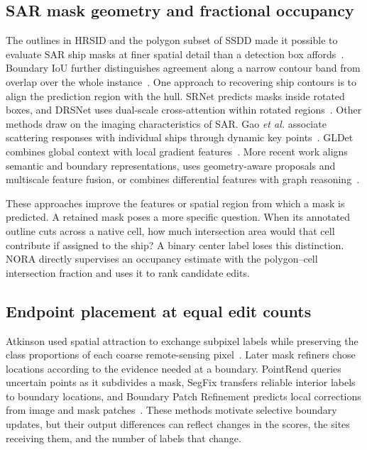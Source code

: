 \documentclass[journal]{IEEEtran}
\begin{document}
\subsection{SAR mask geometry and fractional occupancy}
The outlines in HRSID and the polygon subset of SSDD made it possible to evaluate SAR ship masks at finer spatial detail than a detection box affords~\cite{hrsid,ssdd}. Boundary IoU further distinguishes agreement along a narrow contour band from overlap over the whole instance~\cite{boundaryiou}. One approach to recovering ship contours is to align the prediction region with the hull. SRNet predicts masks inside rotated boxes, and DRSNet uses dual-scale cross-attention within rotated regions~\cite{rsdd,drsnet}. Other methods draw on the imaging characteristics of SAR. Gao \emph{et al.} associate scattering responses with individual ships through dynamic key points~\cite{gao2024}. GLDet combines global context with local gradient features~\cite{gldet}. More recent work aligns semantic and boundary representations, uses geometry-aware proposals and multiscale feature fusion, or combines differential features with graph reasoning~\cite{aranet,dacf,dsr}.

These approaches improve the features or spatial region from which a mask is predicted. A retained mask poses a more specific question. When its annotated outline cuts across a native cell, how much intersection area would that cell contribute if assigned to the ship? A binary center label loses this distinction. NORA directly supervises an occupancy estimate with the polygon--cell intersection fraction and uses it to rank candidate edits.

\subsection{Endpoint placement at equal edit counts}
Atkinson used spatial attraction to exchange subpixel labels while preserving the class proportions of each coarse remote-sensing pixel~\cite{atkinson}. Later mask refiners chose locations according to the evidence needed at a boundary. PointRend queries uncertain points as it subdivides a mask, SegFix transfers reliable interior labels to boundary locations, and Boundary Patch Refinement predicts local corrections from image and mask patches~\cite{pointrend,segfix,bpr}. These methods motivate selective boundary updates, but their output differences can reflect changes in the scores, the sites receiving them, and the number of labels that change.
\end{document}
